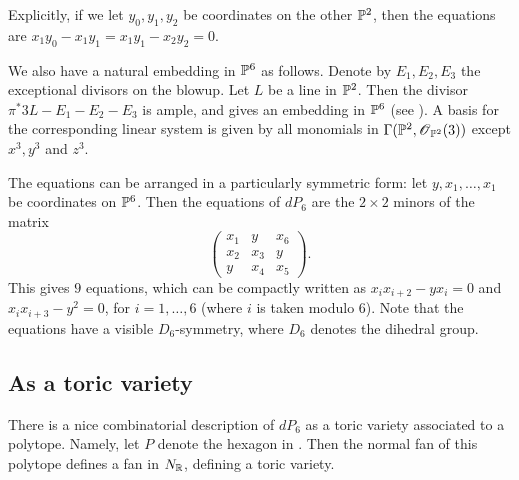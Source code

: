 \documentclass[]{uiophd}
\begin{document}
Explicitly, if we let $y_0,y_1,y_2$ be coordinates on the other $\mathbb{P}^2$, then the equations are $x_1y_0-x_1y_1=x_1y_1-x_2y_2=0$.

We also have a natural embedding in $\mathbb{P}^6$ as follows. Denote by $E_1, E_2, E_3$ the exceptional divisors on the blowup. Let $L$ be a line in $\mathbb{P}^2$. Then the divisor $\pi^\ast 3L - E_1-E_2-E_3$ is ample, and gives an embedding in $\mathbb{P}^6$ (see \cite[Chapter V, Theorem 4.6]{hartshorne}). A basis for the corresponding linear system is given by all monomials in $\Gamma(\mathbb{P}^2,\operatorname{\mathscr{O}}_{\mathbb{P}^2}(3))$ except $x^3,y^3$ and $z^3$. 

The equations can be arranged in a particularly symmetric form: let $y,x_1,\ldots,x_1$ be coordinates on $\mathbb{P}^6$. Then the equations of $dP_6$ are the $2 \times 2$ minors of the matrix
$$
\begin{pmatrix}
x_1 & y & x_6 \\
x_2 & x_3 & y \\
y & x_4 & x_5
\end{pmatrix}.
$$
This gives $9$ equations, which can be compactly written as $x_ix_{i+2}-yx_i=0$ and $x_ix_{i+3}-y^2=0$, for $i=1,\ldots,6$ (where $i$ is taken modulo $6$). Note that the equations have a visible $D_6$-symmetry, where $D_6$ denotes the dihedral group.

\subsection{As a toric variety}

There is a nice combinatorial description of $dP_6$ as a toric variety associated to a polytope. Namely, let $P$ denote the hexagon in . Then the normal fan of this polytope defines a fan in $N_{\mathbb{R}}$, defining a toric variety.
\end{document}
